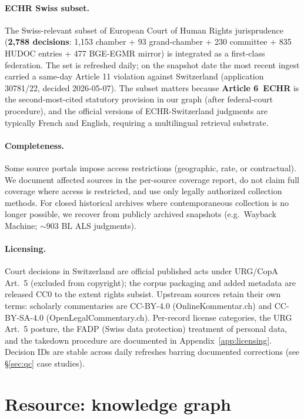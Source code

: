 \documentclass[11pt,a4paper]{article}
\begin{document}
\paragraph{ECHR Swiss subset.} The Swiss-relevant subset of European Court of Human Rights jurisprudence (\textbf{2{,}788 decisions}: 1{,}153 chamber + 93 grand-chamber + 230 committee + 835 HUDOC entries + 477 BGE-EGMR mirror) is integrated as a first-class federation. The set is refreshed daily; on the snapshot date the most recent ingest carried a same-day Article 11 violation against Switzerland (application 30781/22, decided 2026-05-07). The subset matters because \textbf{Article 6~ECHR} is the second-most-cited statutory provision in our graph (after federal-court procedure), and the official versions of ECHR-Switzerland judgments are typically French and English, requiring a multilingual retrieval substrate.

\paragraph{Completeness.} Some source portals impose access restrictions (geographic, rate, or contractual). We document affected sources in the per-source coverage report, do not claim full coverage where access is restricted, and use only legally authorized collection methods. For closed historical archives where contemporaneous collection is no longer possible, we recover from publicly archived snapshots (e.g.\ Wayback Machine; $\sim$903 BL ALS judgments).

\paragraph{Licensing.} Court decisions in Switzerland are official published acts under URG/CopA Art.~5 (excluded from copyright); the corpus packaging and added metadata are released CC0 to the extent rights subsist. Upstream sources retain their own terms: scholarly commentaries are CC-BY-4.0 (OnlineKommentar.ch) and CC-BY-SA-4.0 (OpenLegalCommentary.ch). Per-record license categories, the URG Art.~5 posture, the FADP (Swiss data protection) treatment of personal data, and the takedown procedure are documented in Appendix~\ref{app:licensing}. Decision IDs are stable across daily refreshes barring documented corrections (see \S\ref{sec:qc} case studies).

\section{Resource: knowledge graph}\label{sec:graph}
\end{document}
